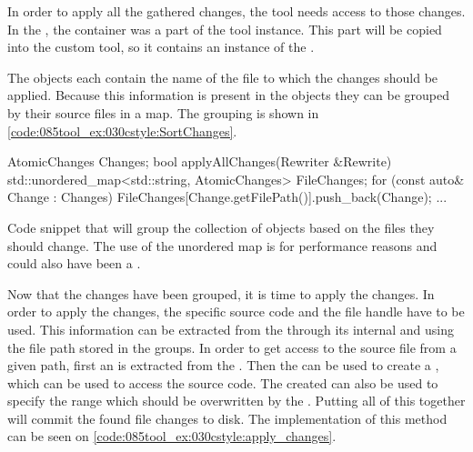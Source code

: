 In order to apply all the gathered changes, the tool needs access to those changes. In the , the  container was a part of the tool instance. This part will be copied into the custom tool, so it contains an instance of the . 

The  objects each contain the name of the file to which the changes should be applied. Because this information is present in the objects they can be grouped by their source files in a map. The grouping is shown in \cref{code:085tool_ex:030cstyle:SortChanges}.

\begin{listing}[H]
    \begin{cppcode}
AtomicChanges Changes;
bool applyAllChanges(Rewriter &Rewrite) {
    std::unordered_map<std::string, AtomicChanges> FileChanges;
    for (const auto& Change : Changes) {
        FileChanges[Change.getFilePath()].push_back(Change);
    }
    ...
}
    \end{cppcode}
    \caption{Code snippet that will group the collection of  objects based on the files they should change. The use of the unordered map is for performance reasons and could also have been a .}
    \label{code:085tool_ex:030cstyle:SortChanges}
\end{listing}

Now that the changes have been grouped, it is time to apply the changes. In order to apply the changes, the specific source code and the file handle have to be used. This information can be extracted from the  through its internal  and  using the file path stored in the groups. In order to get access to the source file from a given path, first an  is extracted from the . Then the  can be used to create a , which can be used to access the source code. The created  can also be used to specify the range which should be overwritten by the . Putting all of this together will commit the found file changes to disk. The implementation of this method can be seen on \cref{code:085tool_ex:030cstyle:apply_changes}.

